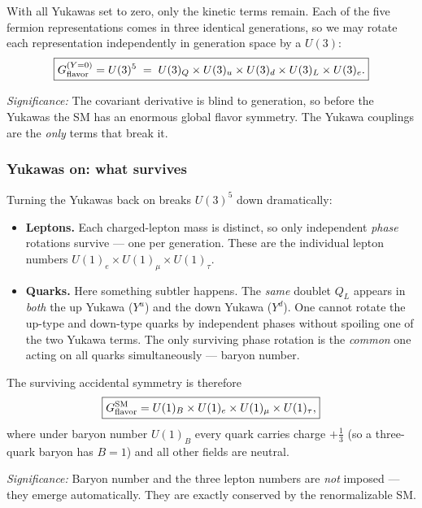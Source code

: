 With all Yukawas set to zero, only the kinetic terms remain. Each of the
five fermion representations comes in three identical generations, so we
may rotate each representation independently in generation space by a
$U(3)$:
\begin{equation}
  \boxed{
    G_{\rm flavor}^{(Y=0)} = U(3)^5
    \;=\; U(3)_Q\times U(3)_u\times U(3)_d\times U(3)_L\times U(3)_e .
  }
  \label{eq:lec21:u3-5}
\end{equation}

\textit{Significance:} The covariant derivative is blind to generation,
so before the Yukawas the SM has an enormous global flavor symmetry. The
Yukawa couplings are the \emph{only} terms that break it.

\subsubsection*{Yukawas on: what survives}

Turning the Yukawas back on breaks $U(3)^5$ down dramatically:
\begin{itemize}
  \item \textbf{Leptons.} Each charged-lepton mass is distinct, so only
        independent \emph{phase} rotations survive --- one per
        generation. These are the individual lepton numbers
        $U(1)_e\times U(1)_\mu\times U(1)_\tau$.
  \item \textbf{Quarks.} Here something subtler happens. The
        \emph{same} doublet $Q_L$ appears in \emph{both} the up Yukawa
        ($Y^u$) and the down Yukawa ($Y^d$). One cannot rotate the
        up-type and down-type quarks by independent phases without
        spoiling one of the two Yukawa terms. The only surviving phase
        rotation is the \emph{common} one acting on all quarks
        simultaneously --- baryon number.
\end{itemize}
The surviving accidental symmetry is therefore
\begin{equation}
  \boxed{
    G_{\rm flavor}^{\rm SM}
    = U(1)_B\times U(1)_e\times U(1)_\mu\times U(1)_\tau,
  }
  \label{eq:lec21:accidental-sm}
\end{equation}
where under baryon number $U(1)_B$ every quark carries charge
$+\tfrac13$ (so a three-quark baryon has $B=1$) and all other fields are
neutral.

\textit{Significance:} Baryon number and the three lepton numbers are
\emph{not} imposed --- they emerge automatically. They are exactly
conserved by the renormalizable SM.

